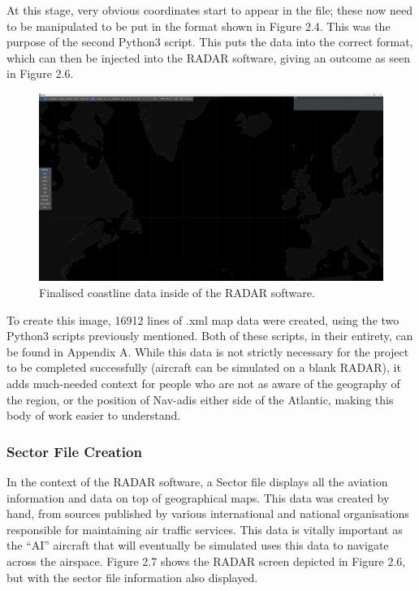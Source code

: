 \documentclass[stu, a4paper, 12pt, floatsintext]{apa7}
\numberwithin{figure}{section}
\numberwithin{table}{section}
\numberwithin{equation}{section}
\begin{document}
At this stage, very obvious coordinates start to appear in the file; these now need to be manipulated to be put in the format shown in Figure 2.4. This was the purpose of the second Python3 script. This puts the data into the correct format, which can then be injected into the RADAR software, giving an outcome as seen in Figure 2.6. 

\begin{figure}[H]
    \caption{Finalised coastline data inside of the RADAR software.}
    \label{fig:2.6}
    \centering
    \includegraphics[width=1.1\textwidth]{pictures/Figure 2.6 FYP.jpg}    
\end{figure}

To create this image, 16912 lines of .xml map data were created, using the two Python3 scripts previously mentioned. Both of these scripts, in their entirety, can be found in Appendix A. While this data is not strictly necessary for the project to be completed successfully (aircraft can be simulated on a blank RADAR), it adds much-needed context for people who are not as aware of the geography of the region, or the position of Nav-adis either side of the Atlantic, making this body of work easier to understand. 

\subsubsection{Sector File Creation}
In the context of the RADAR software, a Sector file displays all the aviation information and data on top of geographical maps. This data was created by hand, from sources published by various international and national organisations responsible for maintaining air traffic services. This data is vitally important as the “AI” aircraft that will eventually be simulated uses this data to navigate across the airspace. Figure 2.7 shows the RADAR screen depicted in Figure 2.6, but with the sector file information also displayed. 
\end{document}
